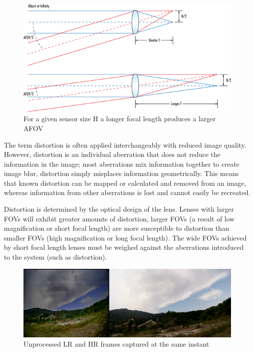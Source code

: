 \begin{figure}[h]
  \centering
  \includegraphics[scale=0.5]{figures/AFOV.png}
  \caption{For a given sensor size H a longer focal length produces a larger AFOV}
\end{figure}

The term distortion is often applied interchangeably with reduced image quality. However, distortion is an individual aberration that does not reduce the information in the image; most aberrations mix information together to create image blur, distortion simply misplaces information geometrically. This means that known distortion can be mapped or calculated and removed from an image, whereas information from other aberrations is lost and cannot easily be recreated.

Distortion is determined by the optical design of the lens. Lenses with larger FOVs will exhibit greater amounts of distortion, larger FOVs (a result of low magnification or short focal length) are more susceptible to distortion than smaller FOVs (high magnification or long focal length). The wide FOVs achieved by short focal length lenses must be weighed against the aberrations introduced to the system (such as distortion)\cite{distortion}.

\begin{figure}[h]
  \centering
  \includegraphics[width=1\textwidth]{figures/OG_sbs.png}
  \caption{Unprocessed LR and HR frames captured at the same instant}
  \label{img:og_sbs}
\end{figure}

